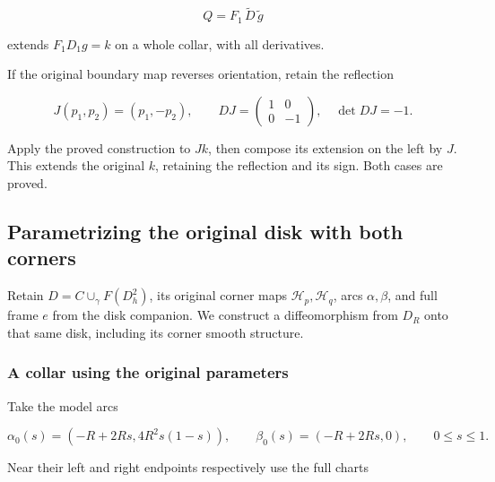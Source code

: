 \begin{equation}
Q=F_1\,\widetilde D\,\widetilde g
\label{courseIII:whitney-move-with-controlled-support:eq:3.10}
\end{equation}

extends \(F_1D_1g=k\) on a whole collar, with all derivatives.

If the original boundary map reverses orientation, retain the reflection

\begin{equation}
J(p_1,p_2)=(p_1,-p_2),\qquad
DJ=\begin{pmatrix}1&0\\0&-1\end{pmatrix},\quad\det DJ=-1.
\label{courseIII:whitney-move-with-controlled-support:eq:3.11}
\end{equation}

Apply the proved construction to \(Jk\), then compose its extension on the left by \(J\). This extends the original \(k\), retaining the reflection and its sign. Both cases are proved.

\subsection{Parametrizing the original disk with both corners}
\label{courseIII:whitney-move-with-controlled-support:move-original-disk}

\label{courseIII:whitney-move-with-controlled-support:section-4}\label{courseIII:whitney-support:4}

Retain \(D=C\cup_\gamma F(D_h^2)\), its original corner maps \(\mathcal H_p,\mathcal H_q\), arcs \(\alpha,\beta\), and full frame \(e\) from the disk companion. We construct a diffeomorphism from \(D_R\) onto that same disk, including its corner smooth structure.

\subsubsection{A collar using the original parameters}
\label{courseIII:whitney-move-with-controlled-support:section-4.1}

Take the model arcs

\begin{equation}
\alpha_0(s)=(-R+2Rs,4R^2s(1-s)),\qquad
\beta_0(s)=(-R+2Rs,0),\qquad 0\leq s\leq1.
\label{courseIII:whitney-move-with-controlled-support:eq:4.1}
\end{equation}

Near their left and right endpoints respectively use the full charts

